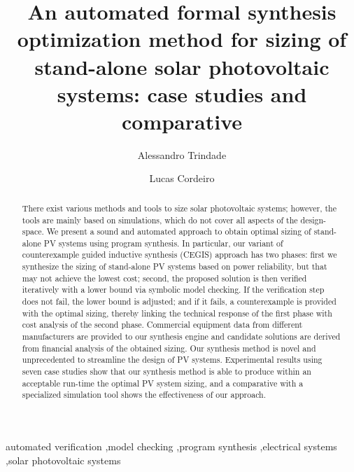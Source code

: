 \documentclass[review]{elsarticle}
\begin{document}
\begin{frontmatter}

\title{An automated formal synthesis optimization method for sizing of stand-alone solar photovoltaic systems: case studies and comparative}
%
%
\author[mymainaddress]{Alessandro Trindade}

\author[mysecondaryaddress]{Lucas Cordeiro}


\address[mymainaddress]{Federal University of Amazonas, Av. Rodrigo Octávio, 6200, Coroado I, 69077-000 Manaus-AM-Brazil}
\address[mysecondaryaddress]{University of Manchester, School of Computer Science, Kilburn Building, Manchester M13 9PL}

\begin{abstract}
There exist various methods and tools to size solar photovoltaic systems; however, the tools are mainly based on simulations, which do not cover all aspects of the design-space. We present a sound and automated approach to obtain optimal sizing of stand-alone PV systems using program synthesis. In particular, our variant of counterexample guided inductive synthesis (CEGIS) approach has two phases: first we synthesize the sizing of stand-alone PV systems based on power reliability, but that may not achieve the lowest cost; second, the proposed solution is then verified iteratively with a lower bound via symbolic model checking. If the verification step does not fail, the lower bound is adjusted; and if it fails, a counterexample is provided with the optimal sizing, thereby linking the technical response of the first phase with cost analysis of the second phase. Commercial equipment data from different manufacturers are provided to our synthesis engine and candidate solutions are derived from financial analysis of the obtained sizing. Our synthesis method is novel and unprecedented to streamline the design of PV systems. Experimental results using seven case studies show that our synthesis method is able to produce within an acceptable run-time the optimal PV system sizing, and a comparative with a specialized simulation tool shows the effectiveness of our approach.
\end{abstract}

\begin{keyword}
automated verification \sep model checking \sep program synthesis \sep electrical systems \sep solar photovoltaic systems
\end{keyword}

\end{frontmatter}
\end{document}
